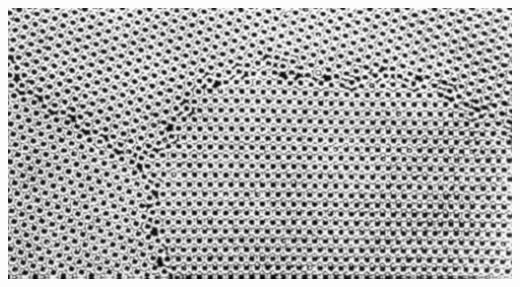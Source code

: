 \documentclass[aspectratio=169]{beamer}
\begin{document}
\begin{frame}{}
\begin{columns}
\includegraphics[width=\linewidth]{PLOTS/domain-boundaries.jpg}
\end{columns}
\end{frame}
\end{document}
